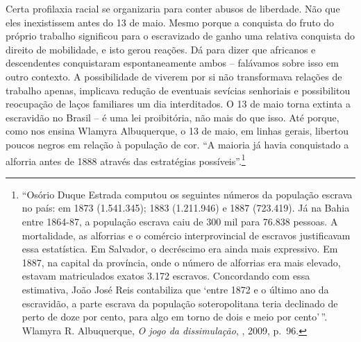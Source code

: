Certa profilaxia racial se organizaria para conter abusos de liberdade.
Não que eles inexistissem antes do 13 de maio. Mesmo porque a conquista
do fruto do próprio trabalho significou para o escravizado de ganho uma
relativa conquista do direito de mobilidade, e isto gerou reações. Dá
para dizer que africanos e descendentes conquistaram espontaneamente
ambos -- falávamos sobre isso em outro contexto. A possibilidade de
viverem por si não transformava relações de trabalho apenas, implicava
redução de eventuais sevícias senhoriais e possibilitou reocupação de
laços familiares um dia interditados. O 13 de maio torna extinta a
escravidão no Brasil -- é uma lei proibitória, não mais do que isso. Até
porque, como nos ensina Wlamyra Albuquerque, o 13 de maio, em linhas
gerais, libertou poucos negros em relação à população de cor. ``A
maioria já havia conquistado a alforria antes de 1888 através das
estratégias possíveis''.\footnote{``Osório Duque Estrada computou os
  seguintes números da população escrava no país: em 1873 (1.541.345);
  1883 (1.211.946) e 1887 (723.419). Já na Bahia entre 1864-87, a
  população escrava caiu de 300 mil para 76.838 pessoas. A mortalidade,
  as alforrias e o comércio interprovincial de escravos justificavam
  essa estatística. Em Salvador, o decréscimo era ainda mais expressivo.
  Em 1887, na capital da província, onde o número de alforrias era mais
  elevado, estavam matriculados exatos 3.172 escravos. Concordando com
  essa estimativa, João José Reis contabiliza que `entre 1872 e o último
  ano da escravidão, a parte escrava da população soteropolitana teria
  declinado de perto de doze por cento, para algo em torno de dois e
  meio por cento'\,''. Wlamyra R. Albuquerque, \emph{O jogo da
  dissimulação}, , 2009, p.~96.}

